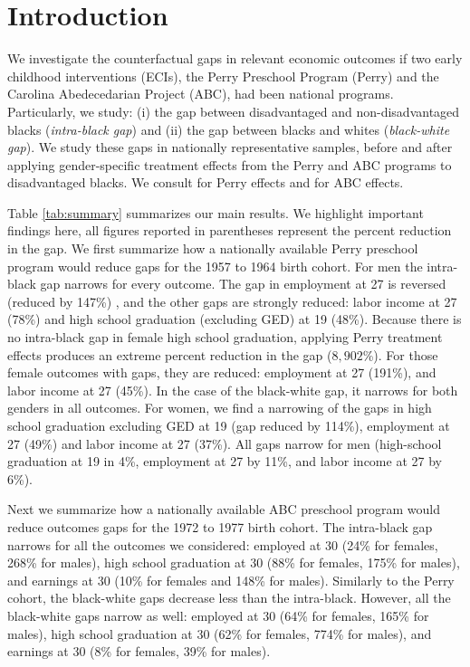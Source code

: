 \makeatletter

\section{Introduction}
We investigate the counterfactual gaps in relevant economic outcomes if two early childhood interventions (ECIs), the Perry Preschool Program (Perry) and the Carolina Abedecedarian Project (ABC), had been national programs. Particularly, we study: (i) the gap between disadvantaged and non-disadvantaged blacks (\emph{intra-black gap}) and (ii) the gap between blacks and whites (\emph{black-white gap}). We study these gaps in nationally representative samples, before and after applying gender-specific treatment effects from the Perry and ABC programs to disadvantaged blacks. We consult \citet{heckman2010analyzing} for Perry effects and \citet{Frances_2013_EJ} for ABC effects.

Table \ref{tab:summary} summarizes our main results. We highlight important findings here, all figures reported in parentheses represent the percent reduction in the gap. We first summarize how a nationally available Perry preschool program would reduce gaps for the 1957 to 1964 birth cohort. For men the intra-black gap narrows for every outcome. The gap in employment at 27 is reversed (reduced by 147\%) , and the other gaps are strongly reduced: labor income at 27 (78\%) and high school graduation (excluding GED) at 19  (48\%). Because there is no intra-black gap in female high school graduation, applying Perry treatment effects produces an extreme percent reduction in the gap ($8,902$\%). For those female outcomes with gaps, they are reduced: employment at 27 (191\%), and labor income at 27 (45\%). In the case of the black-white gap, it narrows for both genders in all outcomes. For women, we find a narrowing of the gaps in high school graduation excluding GED at 19 (gap reduced by 114\%), employment at 27 (49\%) and labor income at 27 (37\%). All gaps narrow for men (high-school graduation at 19 in 4\%, employment at 27 by 11\%, and labor income at 27 by 6\%). 

Next we summarize how a nationally available ABC preschool program would reduce outcomes gaps for the 1972 to 1977 birth cohort. The intra-black gap narrows for all the outcomes we considered: employed at 30 (24\% for females, 268\% for males), high school graduation at 30 (88\% for females, 175\% for males), and earnings at 30 (10\% for females and 148\% for males). Similarly to the Perry cohort, the black-white gaps decrease less than the intra-black. However, all the black-white gaps narrow as well: employed at 30 (64\% for females, 165\% for males), high school graduation at 30 (62\% for females, 774\% for males), and earnings at 30 (8\% for females, 39\% for males).


